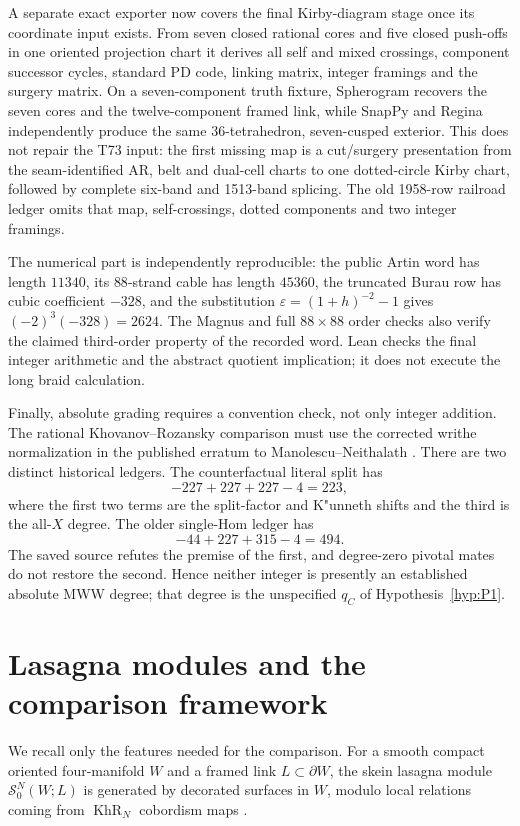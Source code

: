 \documentclass[11pt]{amsart}
\theoremstyle{definition}
\theoremstyle{remark}
\newcommand{\SN}{\mathcal{S}^{N}_{0}}
\newcommand{\KhR}{\operatorname{KhR}}
\begin{document}
A separate exact exporter now covers the final Kirby-diagram stage once its
coordinate input exists.  From seven closed rational cores and five closed
push-offs in one oriented projection chart it derives all self and mixed
crossings, component successor cycles, standard PD code, linking matrix,
integer framings and the surgery matrix.  On a seven-component truth fixture,
Spherogram recovers the seven cores and the twelve-component framed link,
while SnapPy and Regina independently produce the same 36-tetrahedron,
seven-cusped exterior.  This does not repair the T73 input: the first missing
map is a cut/surgery presentation from the seam-identified AR, belt and
dual-cell charts to one dotted-circle Kirby chart, followed by complete
six-band and 1513-band splicing.  The old 1958-row railroad ledger omits that
map, self-crossings, dotted components and two integer framings.

The numerical part is independently reproducible: the public Artin word has
length $11340$, its $88$-strand cable has length $45360$, the truncated Burau
row has cubic coefficient $-328$, and the substitution
$\varepsilon=(1+h)^{-2}-1$ gives $(-2)^3(-328)=2624$.  The Magnus and full
$88\times88$ order checks also verify the claimed third-order property of the
recorded word.  Lean checks the final integer arithmetic and the abstract
quotient implication; it does not execute the long braid calculation.

Finally, absolute grading requires a convention check, not only integer
addition.  The rational Khovanov--Rozansky comparison must use the corrected
writhe normalization in the published erratum to Manolescu--Neithalath
\cite{ManolescuNeithalathErrata2026}.
There are two distinct historical ledgers.  The counterfactual literal split
has
\[
-227+227+227-4=223,
\]
where the first two terms are the split-factor and K"unneth shifts and the
third is the all-$X$ degree.  The older single-Hom ledger has
\[
-44+227+315-4=494.
\]
The saved source refutes the premise of the first, and degree-zero pivotal
mates do not restore the second.  Hence neither integer is presently an
established absolute MWW degree; that degree is the unspecified $q_C$ of
Hypothesis~\ref{hyp:P1}.

\section{Lasagna modules and the comparison framework}

We recall only the features needed for the comparison.  For a smooth
compact oriented four-manifold $W$ and a framed link $L\subset\partial W$,
the skein lasagna module $\SN(W;L)$ is generated by decorated surfaces in
$W$, modulo local relations coming from $\KhR_N$ cobordism maps
\cite{MorrisonWalkerWedrich2019,ManolescuWalkerWedrich2023}.
\end{document}
